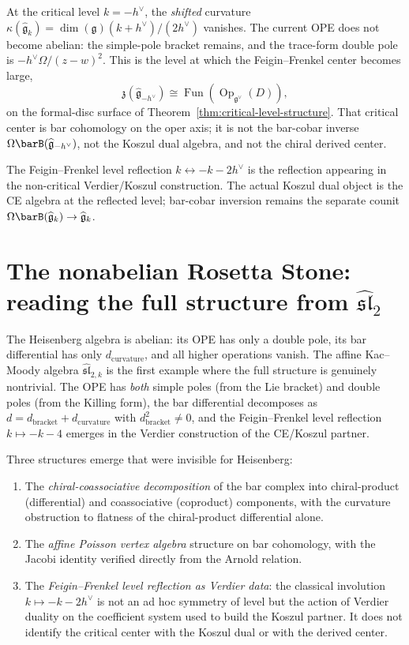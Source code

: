 At the critical level $k = -h^\vee$, the \emph{shifted} curvature
$\kappa(\widehat{\mathfrak{g}}_k)
=\dim(\mathfrak g)(k+h^\vee)/(2h^\vee)$ vanishes. The current OPE
does not become abelian: the simple-pole bracket remains, and the
trace-form double pole is $-h^\vee\Omega/(z-w)^2$. This is the
level at which the Feigin--Frenkel center becomes large,
\[
\mathfrak{z}(\widehat{\mathfrak{g}}_{-h^\vee})
\cong
\operatorname{Fun}(\operatorname{Op}_{\mathfrak{g}^\vee}(D)),
\]
on the formal-disc surface of
Theorem~\ref{thm:critical-level-structure}. That critical center is
bar cohomology on the oper axis; it is not the bar-cobar inverse
$\Omega\barB(\widehat{\mathfrak g}_{-h^\vee})$, not the Koszul
dual algebra, and not the chiral derived center.

The Feigin--Frenkel level reflection $k \leftrightarrow -k - 2h^\vee$
is the reflection appearing in the non-critical Verdier/Koszul
construction. The actual Koszul dual object is the CE algebra at the
reflected level; bar-cobar inversion remains the separate counit
$\Omega\barB(\widehat{\mathfrak g}_k)\to\widehat{\mathfrak g}_k$.

\section{The nonabelian Rosetta Stone: reading the full structure
from \texorpdfstring{$\widehat{\mathfrak{sl}}_2$}{affine sl2}}
\label{sec:rosetta-sl2}

The Heisenberg algebra is abelian: its OPE has only a double pole,
its bar differential has only $d_{\mathrm{curvature}}$, and all
higher operations vanish. The affine Kac--Moody algebra
$\widehat{\mathfrak{sl}}_{2,k}$ is the first example where the full
structure is genuinely nontrivial. The OPE has \emph{both} simple
poles (from the Lie bracket) and double poles (from the Killing form),
the bar differential decomposes as
$d = d_{\mathrm{bracket}} + d_{\mathrm{curvature}}$ with
$d_{\mathrm{bracket}}^2 \neq 0$, and the Feigin--Frenkel level
reflection $k \mapsto -k-4$ emerges in the Verdier
construction of the CE/Koszul partner.

Three structures emerge that were invisible for Heisenberg:
\begin{enumerate}
\item The \emph{chiral-coassociative decomposition} of the bar complex into
 chiral-product (differential) and coassociative (coproduct) components,
 with the curvature obstruction to flatness of the chiral-product
 differential alone.
\item The \emph{affine Poisson vertex algebra} structure on bar
 cohomology, with the Jacobi identity verified directly from the
 Arnold relation.
\item The \emph{Feigin--Frenkel level reflection as Verdier data}:
 the classical involution $k \mapsto -k - 2h^\vee$ is not an
 ad hoc symmetry of level but the action of Verdier duality on the
 coefficient system used to build the Koszul partner. It does not
 identify the critical center with the Koszul dual or with the
 derived center.
\end{enumerate}


